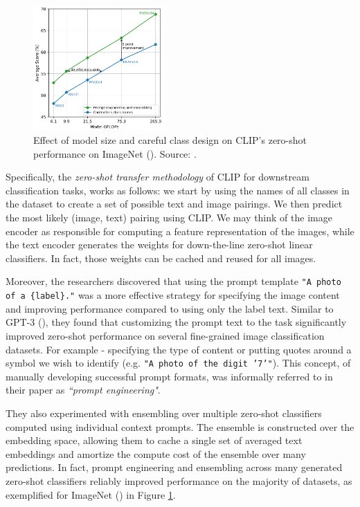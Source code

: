 \documentclass{article}
\begin{document}
\begin{figure}
    \centering
    \vspace{-2mm}
    \includegraphics[width=0.45\textwidth]{figures/clip_fig4.png}
    \caption{
        Effect of model size and careful class design on CLIP's zero-shot performance on ImageNet (\citet{deng2009imagenet}). Source: \citet{radford2021clip}.
    }
    \label{fig:clip_fig4}
    \vspace{-4mm}
\end{figure}

\medskip
\noindent
Specifically, the \emph{zero-shot transfer methodology} of CLIP for downstream classification tasks, works as follows: we start by using the names of all classes in the dataset to create a set of possible text and image pairings. We then predict the most likely (image, text) pairing using CLIP. We may think of the image encoder as responsible for computing a feature representation of the images, while the text encoder generates the weights for down-the-line zero-shot linear classifiers. In fact, those weights can be cached and reused for all images.

\medskip
\noindent
Moreover, the researchers discovered that using the prompt template \texttt{"A photo of a \{label\}."} was a more effective strategy for specifying the image content and improving performance compared to using only the label text. Similar to GPT-3 (\citet{brown2020gpt3}), they found that customizing the prompt text to the task significantly improved zero-shot performance on several fine-grained image classification datasets. For example - specifying the type of content or putting quotes around a symbol we wish to identify (e.g. \texttt{"A photo of the digit '7'"}). This concept, of manually developing successful prompt formats, was informally referred to in their paper as \emph{``prompt engineering"}.

\medskip
\noindent
They also experimented with ensembling over multiple zero-shot classifiers computed using individual context prompts. The ensemble is constructed over the embedding space, allowing them to cache a single set of averaged text embeddings and amortize the compute cost of the ensemble over many predictions. In fact, prompt engineering and ensembling across many generated zero-shot classifiers reliably improved performance on the majority of datasets, as exemplified for ImageNet (\citet{deng2009imagenet}) in Figure \ref{fig:clip_fig4}.
\end{document}
